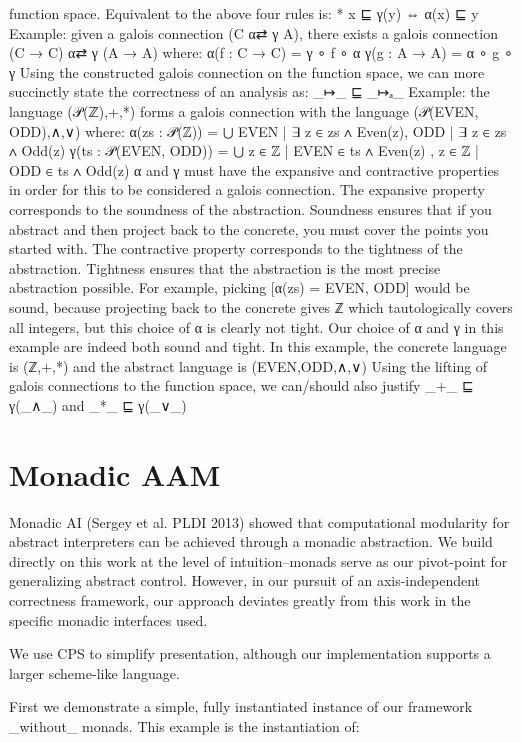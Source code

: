 \documentclass{article}
\begin{document}
function space.
%
Equivalent to the above four rules is:
%
* x ⊑ γ(y) ⇔  α(x) ⊑ y
%
Example: given a galois connection (C α⇄ γ A), there exists a galois connection
(C → C) α⇄ γ (A → A) where:
%
α(f : C → C) = γ ∘ f ∘ α
γ(g : A → A) = α ∘ g ∘ γ
%
Using the constructed galois connection on the function space, we can more
succinctly state the correctness of an analysis as:
%
_↦_ ⊑ _↦ₐ_
%
Example: the language (𝒫(ℤ),+,*) forms a galois connection with the language
(𝒫({EVEN, ODD}),∧,∨) where:
%
α(zs : 𝒫(ℤ)) = ⋃ { { EVEN | ∃ z ∈ zs ∧ Even(z)}, { ODD | ∃ z ∈ zs ∧ Odd(z) } }
γ(ts : 𝒫({EVEN, ODD})) = ⋃ { { z ∈ ℤ | EVEN ∈ ts ∧ Even(z) }, { z ∈ ℤ | ODD ∈ ts ∧ Odd(z) } }
%
α and γ must have the expansive and contractive properties in order
for this to be considered a galois connection.  The expansive property
corresponds to the soundness of the abstraction.  Soundness ensures that if
you abstract and then project back to the concrete, you must cover the points
you started with.  The contractive property corresponds to the tightness of
the abstraction.  Tightness ensures that the abstraction is the most precise
abstraction possible.  For example, picking [α(zs) = {EVEN, ODD}] would be
sound, because projecting back to the concrete gives ℤ which tautologically
covers all integers, but this choice of α is clearly not tight.  Our choice
of α and γ in this example are indeed both sound and tight.
%
In this example, the concrete language is (ℤ,+,*) and the abstract language is
({EVEN,ODD},∧,∨)
%
Using the lifting of galois connections to the function space, we can/should
also justify _+_ ⊑ γ(_∧_) and _*_ ⊑ γ(_∨_)
%


\section{Monadic AAM}
\label{section:MonadicAAM}

Monadic AI (Sergey et al. PLDI 2013) showed that computational modularity for
abstract interpreters can be achieved through a monadic abstraction.  We build
directly on this work at the level of intuition--monads serve as our
pivot-point for generalizing abstract control. However, in our pursuit of an
axis-independent correctness framework, our approach deviates greatly from this
work in the specific monadic interfaces used.

We use CPS to simplify presentation, although our implementation supports a
larger scheme-like language.

First we demonstrate a simple, fully instantiated instance of our framework
_without_ monads. This example is the instantiation of:
\end{document}
